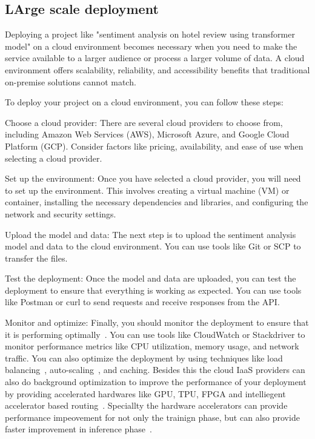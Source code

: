 \subsection{LArge scale deployment}
Deploying a project like "sentiment analysis on hotel review using transformer model" on a cloud environment becomes necessary when you need 
to make the service available to a larger audience or process a larger volume of data. A cloud environment offers scalability, 
reliability, and accessibility benefits that traditional on-premise solutions cannot match.

To deploy your project on a cloud environment, you can follow these steps:

Choose a cloud provider: There are several cloud providers to choose from, including Amazon Web Services (AWS), Microsoft Azure, and Google Cloud Platform (GCP). Consider factors like pricing, availability, and ease of use when selecting a cloud provider.

Set up the environment: Once you have selected a cloud provider, you will need to set up the environment. This involves creating a virtual machine (VM) or container, installing the necessary dependencies and libraries, and configuring the network and security settings.

Upload the model and data: The next step is to upload the sentiment analysis model and data to the cloud environment. You can use tools like Git or SCP to transfer the files.

Test the deployment: Once the model and data are uploaded, you can test the deployment to ensure that everything is working as expected. You can use tools like Postman or curl to send requests and receive responses from the API.

Monitor and optimize: Finally, you should monitor the deployment to ensure that it is performing optimally~\cite{cortellessa2022model}. 
You can use tools like CloudWatch or Stackdriver to monitor performance metrics like CPU utilization, memory usage, and network traffic. 
You can also optimize the deployment by using techniques like load balancing~\cite{robin2022clb}, auto-scaling~\cite{lorido2014review}, and caching. Besides this 
the cloud IaaS providers can also do background optimization to improve the performance of your deployment by  providing 
accelerated  hardwares like GPU, TPU, FPGA and intelliegent accelerator based routing~\cite{robin2021p4kp}. 
Speciallty the hardware accelerators can provide performance impeovement for not only the trainign phase, but can also 
provide faster improvement in inference phase~\cite{lu2020hardware}.

